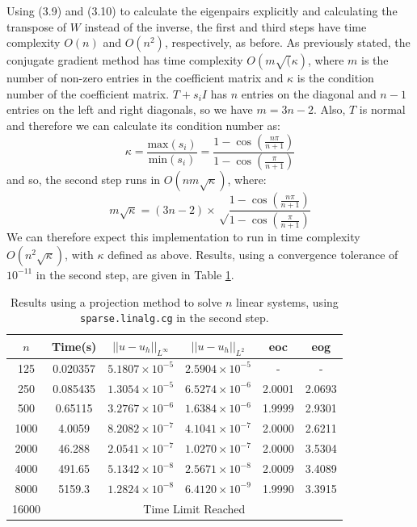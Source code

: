\documentclass[11pt]{article}
\numberwithin{equation}{section}
\begin{document}
Using (3.9) and (3.10) to calculate the eigenpairs explicitly and calculating the transpose of $W$ instead of the inverse, the first and third steps have time complexity $O(n)$ and $O(n^2)$, respectively, as before. As previously stated, the conjugate gradient method has time complexity $O(m\sqrt(\kappa)$, where $m$ is the number of non-zero entries in the coefficient matrix and $\kappa$ is the condition number of the coefficient matrix. $T+s_i I$ has $n$ entries on the diagonal and $n-1$ entries on the left and right diagonals, so we have $m=3n-2$. Also, $T$ is normal and therefore we can calculate its condition number as:
\begin{equation}
\kappa = \frac{\text{max}(s_i)}{\text{min}(s_i)} = \frac{1-\cos \left(\frac{n \pi}{n+1} \right)}{1-\cos \left(\frac{\pi}{n+1} \right)}
\end{equation}
and so, the second step runs in $O(n m\sqrt{\kappa})$, where:
\begin{equation}
m\sqrt{\kappa} = (3n-2) \times \sqrt \frac{1-\cos \left(\frac{n \pi}{n+1} \right)}{1-\cos \left(\frac{\pi}{n+1} \right)}
\end{equation}
We can therefore expect this implementation to run in time complexity $O(n^2 \sqrt{\kappa})$, with $\kappa$ defined as above. Results, using a convergence tolerance of $10^{-11}$ in the second step, are given in Table \ref{table:shifted it}. 

\begin{table}[H]
\centering
\begin{tabular}{|c|c|c|c|c|c|}
\hline
$n$ & Time(s) & $|| u - u_h ||_{L^{\infty}}$ &$|| u - u_h ||_{L^{2}}$ & eoc & eog \\
\hline
125 & 0.020357 & $5.1807 \times 10^{-5}$ & $2.5904 \times 10^{-5}$ & - & - \\
250 & 0.085435 & $1.3054 \times 10^{-5}$ & $6.5274 \times 10^{-6}$ & 2.0001  & 2.0693 \\
500 & 0.65115 & $3.2767 \times 10^{-6}$ & $1.6384 \times 10^{-6}$ & 1.9999  & 2.9301 \\
1000 & 4.0059 & $8.2082 \times 10^{-7}$ & $4.1041 \times 10^{-7}$ & 2.0000 & 2.6211 \\
2000 & 46.288 & $2.0541 \times 10^{-7}$ & $1.0270 \times 10^{-7}$ & 2.0000 & 3.5304 \\
4000 & 491.65 & $5.1342 \times 10^{-8}$ & $2.5671 \times 10^{-8}$ & 2.0009 &  3.4089 \\
8000 & 5159.3 & $1.2824 \times 10^{-8}$ & $6.4120 \times 10^{-9}$ & 1.9990 & 3.3915 \\
\cline{2-6} 
16000 & \multicolumn{5}{c|}{Time Limit Reached} \\
\hline
\end{tabular}
\captionsetup{justification=centering}
\caption{Results using a projection method to solve $n$ linear systems, using \texttt{sparse.linalg.cg} in the second step.}
\label{table:shifted it}
\end{table}
\end{document}
